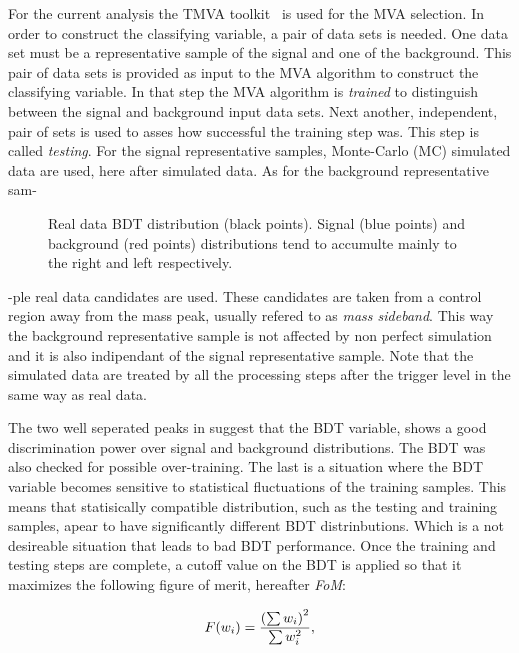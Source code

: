 For the current analysis the TMVA toolkit~\cite{TMVA} is used for the MVA selection. In order to construct the classifying variable,
a pair of data sets is needed. One data set must be a representative sample of the signal and one of the background.
This pair of data sets is provided as input to the MVA algorithm to construct the classifying variable.
In that step the MVA algorithm is {\it trained} to distinguish between the signal and background input data sets.
Next another, independent, pair of sets is used to asses how successful the training step was. This step is called {\it testing}.
For the signal representative samples, \BsJpsiKst Monte-Carlo (MC) simulated data are used, here after simulated data.
As for the background representative sam-

\begin{figure}[!t]
\centering
  \scalebox{1}{}
  \caption{Real data BDT distribution (black points). Signal (blue points) and background (red points) distributions
           tend to accumulte mainly to the right and left respectively.}
  \label{BTDG_performance}
\end{figure}

\noindent -ple real data candidates are used. These candidates are taken from a control
region away from the \BsJpsiKst mass peak, usually refered to as {\it mass sideband}. This way the background representative sample
is not affected by non perfect simulation and it is also indipendant of the signal representative sample.
Note that the simulated data are treated by all the processing steps after the \lone trigger level in the same way as real data.

The two well seperated peaks in  suggest that the BDT variable, shows a good discrimination
power over signal and background distributions. The BDT was also checked for possible over-training. The last is a
situation where the BDT variable becomes sensitive to statistical fluctuations of the training samples.
This means that statisically compatible distribution, such as the testing and training samples,
apear to have significantly different BDT distrinbutions. Which is a not desireable situation that leads to
bad BDT performance. Once the training and testing steps are complete, a cutoff value on the BDT is applied
so that it maximizes the following figure of merit, hereafter {\it FoM}:

\begin{equation}
  \centering
  F(w_i) = \frac{\left(\sum{w_{i}}\right)^2}{\sum{w_{i}^2}},
\label{eqn:fom}
\end{equation}

